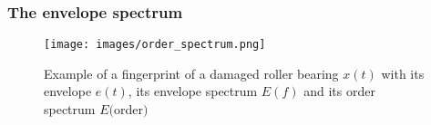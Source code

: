 \begin{frame}
    \frametitle{The envelope spectrum}
    \small
    
    \begin{figure}
        \centering
        \texttt{[image: images/order\_spectrum.png]}
        \caption{Example of a fingerprint of a damaged roller bearing $x(t)$ with its envelope $e(t)$, its envelope spectrum $E(f)$ and its order spectrum $E($order$)$}
        \label{fig:order_spectrum}
    \end{figure}
   
\end{frame}